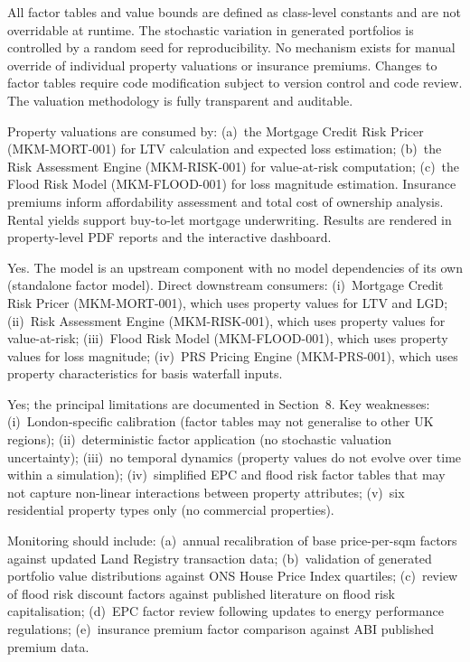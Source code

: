 \documentclass[11pt,a4paper]{article}
\begin{document}
All factor tables and value bounds are defined as class-level constants and are not overridable at runtime. The stochastic variation in generated portfolios is controlled by a random seed for reproducibility. No mechanism exists for manual override of individual property valuations or insurance premiums. Changes to factor tables require code modification subject to version control and code review. The valuation methodology is fully transparent and auditable.

Property valuations are consumed by: (a)~the Mortgage Credit Risk Pricer (MKM-MORT-001) for LTV calculation and expected loss estimation; (b)~the Risk Assessment Engine (MKM-RISK-001) for value-at-risk computation; (c)~the Flood Risk Model (MKM-FLOOD-001) for loss magnitude estimation. Insurance premiums inform affordability assessment and total cost of ownership analysis. Rental yields support buy-to-let mortgage underwriting. Results are rendered in property-level PDF reports and the interactive dashboard.

Yes. The model is an upstream component with no model dependencies of its own (standalone factor model). Direct downstream consumers: (i)~Mortgage Credit Risk Pricer (MKM-MORT-001), which uses property values for LTV and LGD; (ii)~Risk Assessment Engine (MKM-RISK-001), which uses property values for value-at-risk; (iii)~Flood Risk Model (MKM-FLOOD-001), which uses property values for loss magnitude; (iv)~PRS Pricing Engine (MKM-PRS-001), which uses property characteristics for basis waterfall inputs.

Yes; the principal limitations are documented in Section~8. Key weaknesses: (i)~London-specific calibration (factor tables may not generalise to other UK regions); (ii)~deterministic factor application (no stochastic valuation uncertainty); (iii)~no temporal dynamics (property values do not evolve over time within a simulation); (iv)~simplified EPC and flood risk factor tables that may not capture non-linear interactions between property attributes; (v)~six residential property types only (no commercial properties).

Monitoring should include: (a)~annual recalibration of base price-per-sqm factors against updated Land Registry transaction data; (b)~validation of generated portfolio value distributions against ONS House Price Index quartiles; (c)~review of flood risk discount factors against published literature on flood risk capitalisation; (d)~EPC factor review following updates to energy performance regulations; (e)~insurance premium factor comparison against ABI published premium data.
\end{document}
